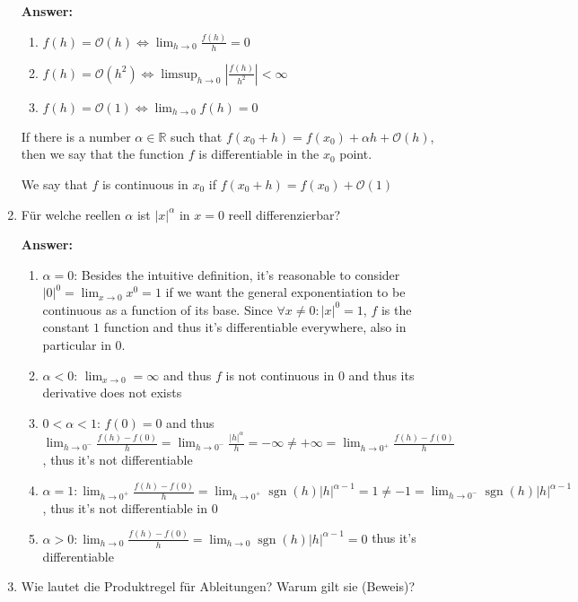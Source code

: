 \documentclass[11pt]{article}
\newcommand{\abs}[1]{\left|#1\right|}
\newcommand{\RR}[0]{\mathbb{R}}
\newcommand{\smallo}[0]{{\scriptstyle \mathcal{O}}}
\begin{document}
\begin{enumerate}
    \textbf{Answer:}
    \begin{enumerate}
        \item $f(h) = \smallo(h) \Leftrightarrow \lim_{h\to0}\frac{f(h)}{h} = 0$
        \item $f(h) = \mathcal{O}(h^2) \Leftrightarrow \limsup_{h\to0}\abs{\frac{f(h)}{h^2}} < \infty$
        \item $f(h) = \smallo(1) \Leftrightarrow \lim_{h\to0} f(h) = 0$
    \end{enumerate}

    If there is a number $\alpha \in \RR$ such that $f(x_0+h) = f(x_0) + \alpha h + \smallo(h)$, then we say that the function $f$ is differentiable in the $x_0$ point.

    We say that $f$ is continuous in $x_0$ if $f(x_0 + h) = f(x_0) + \smallo(1)$

    \item Für welche reellen $\alpha$ ist $\abs{x}^\alpha$ in $x = 0$ reell differenzierbar?
    
    \textbf{Answer:}
    \begin{enumerate}
        \item $\alpha = 0$: Besides the intuitive definition, it's reasonable to consider $\abs{0}^0 = \lim_{x\to0} x^0 = 1$ if we want the general exponentiation to be continuous as a function of its base. Since $\forall x \neq 0\colon \abs{x}^0 = 1$, $f$ is the constant $1$ function and thus it's differentiable everywhere, also in particular in $0$.
        \item $\alpha < 0$: $\lim_{x\to0} = \infty$ and thus $f$ is not continuous in $0$ and thus its derivative does not exists
        \item $0 < \alpha < 1$: $f(0) = 0$ and thus $\lim_{h\to0^-}\frac{f(h) - f(0)}{h} = \lim_{h\to0^-}\frac{\abs{h}^\alpha}{h} = -\infty \neq +\infty = \lim_{h\to0^+}\frac{f(h) - f(0)}{h}$, thus it's not differentiable
        \item $\alpha = 1\colon \lim_{h\to0^+}\frac{f(h) - f(0)}{h} = \lim_{h\to0^+}\operatorname{sgn}(h)\abs{h}^{\alpha-1} = 1 \neq -1 = \lim_{h\to0^-}\operatorname{sgn}(h)\abs{h}^{\alpha-1}$, thus it's not differentiable in $0$
        \item $\alpha > 0\colon \lim_{h\to0}\frac{f(h) - f(0)}{h} = \lim_{h\to0} \operatorname{sgn}(h)\abs{h}^{\alpha-1} = 0$ thus it's differentiable 
    \end{enumerate}

    \item Wie lautet die Produktregel für Ableitungen? Warum gilt sie (Beweis)?
    

\end{enumerate}
\end{document}
